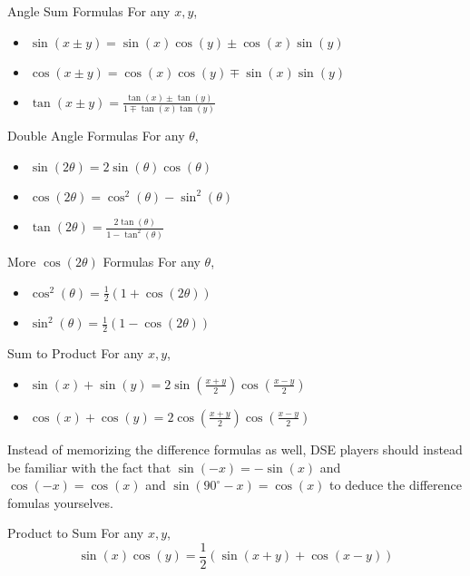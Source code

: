 \documentclass[a4paper]{article}
\begin{document}
\begin{prp}{Angle Sum Formulas}{} For any $x,y$,
\begin{itemize}
\item $\sin(x\pm y)=\sin(x)\cos(y)\pm\cos(x)\sin(y)$
\item $\cos(x\pm y)=\cos(x)\cos(y)\mp\sin(x)\sin(y)$
\item $\tan(x\pm y)=\frac{\tan(x)\pm\tan(y)}{1\mp\tan(x)\tan(y)}$
\end{itemize}
\end{prp}

\begin{prp}{Double Angle Formulas}{} For any $\theta$,
\begin{itemize}
\item $\sin(2\theta)=2\sin(\theta)\cos(\theta)$
\item $\cos(2\theta)=\cos^2(\theta)-\sin^2(\theta)$
\item $\tan(2\theta)=\frac{2\tan(\theta)}{1-\tan^2(\theta)}$
\end{itemize}
\end{prp}

\begin{prp}{More $\cos(2\theta)$ Formulas}{} For any $\theta$,
\begin{itemize}
\item $\cos^2(\theta)=\frac{1}{2}(1+\cos(2\theta))$
\item $\sin^2(\theta)=\frac{1}{2}(1-\cos(2\theta))$
\end{itemize}
\end{prp}

\begin{prp}{Sum to Product}{} For any $x,y$,
\begin{itemize}
\item $\sin(x)+\sin(y)=2\sin\left(\frac{x+y}{2}\right)\cos\left(\frac{x-y}{2}\right)$
\item $\cos(x)+\cos(y)=2\cos\left(\frac{x+y}{2}\right)\cos\left(\frac{x-y}{2}\right)$
\end{itemize}
\end{prp}

Instead of memorizing the difference formulas as well, DSE players should instead be familiar with the fact that $\sin(-x)=-\sin(x)$ and $\cos(-x)=\cos(x)$ and $\sin(90^\circ-x)=\cos(x)$ to deduce the difference fomulas yourselves. 

\begin{prp}{Product to Sum}{} For any $x,y$, $$\sin(x)\cos(y)=\frac{1}{2}(\sin(x+y)+\cos(x-y))$$
\end{prp}
\end{document}
